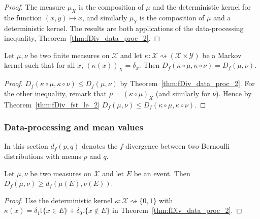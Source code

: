 \begin{proof}\leanok
{}
The measure $\mu_X$ is the composition of $\mu$ and the deterministic kernel for the function $(x,y) \mapsto x$, and similarly $\mu_Y$ is the composition of $\mu$ and a deterministic kernel.
The results are both applications of the data-processing inequality, Theorem~\ref{thm:fDiv_data_proc_2}.
\end{proof}


\begin{lemma}
  \label{lem:fDiv_compProd_prod_eq}
  \leanok
  Let $\mu, \nu$ be two finite measures on $\mathcal X$ and let $\kappa : \mathcal X \rightsquigarrow (\mathcal X \times \mathcal Y)$ be a Markov kernel such that for all $x$, $(\kappa(x))_X = \delta_x$. Then $D_f(\kappa \circ \mu, \kappa \circ \nu) = D_f(\mu, \nu)$.
\end{lemma}

\begin{proof}\leanok
{}
$D_f(\kappa \circ \mu, \kappa \circ \nu) \le D_f(\mu, \nu)$ by Theorem~\ref{thm:fDiv_data_proc_2}.
For the other inequality, remark that $\mu = (\kappa \circ \mu)_X$ (and similarly for $\nu$). Hence by Theorem~\ref{thm:fDiv_fst_le_2} $D_f(\mu, \nu) \le D_f(\kappa \circ \mu, \kappa \circ \nu)$.
\end{proof}



\subsubsection{Data-processing and mean values}

In this section $d_f(p, q)$ denotes the $f$-divergence between two Bernoulli distributions with means $p$ and $q$.

\begin{corollary}
  \label{cor:data_proc_event}
  \leanok
  Let $\mu, \nu$ be two measures on $\mathcal X$ and let $E$ be an event. Then $D_f(\mu, \nu) \ge d_f(\mu(E), \nu(E))$.
\end{corollary}

\begin{proof}\leanok
{}
Use the deterministic kernel $\kappa : \mathcal X \rightsquigarrow \{0, 1\}$ with $\kappa(x) = \delta_1 \mathbb{I}\{x \in E\} + \delta_0 \mathbb{I}\{x \notin E\}$ in Theorem~\ref{thm:fDiv_data_proc_2}.
\end{proof}


